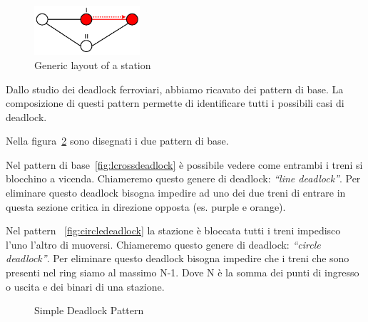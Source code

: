 \documentclass{ewic}
\begin{document}
\begin{figure}[htp]
	\begin{centering}	
	\includegraphics[width=0.35\textwidth, clip]{img/rappresentazione}
	\caption{Generic layout of a station}
	\label{fig:rappresent}
	\end{centering}
\end{figure}

Dallo studio dei deadlock ferroviari, abbiamo ricavato dei pattern di base. 
La composizione di questi pattern permette di identificare tutti i possibili casi di deadlock.

Nella figura~\ref{fig:simpledeadlockpattern} sono disegnati i due pattern di base.

Nel pattern di base~\ref{fig:lcrossdeadlock} è possibile vedere come entrambi i treni si blocchino a vicenda. Chiameremo questo genere di deadlock:  \emph{``line deadlock''}. Per eliminare questo deadlock bisogna impedire ad uno dei due treni di entrare in questa sezione critica in direzione opposta (es. purple e orange).

Nel pattern ~\ref{fig:circledeadlock} la stazione è bloccata tutti i treni impedisco l'uno l'altro di muoversi. Chiameremo questo genere di deadlock:  \emph{``circle deadlock''}. Per eliminare questo deadlock bisogna impedire che i treni che sono presenti nel ring siamo al massimo N-1. Dove N è la somma dei punti di ingresso o uscita e dei binari di una stazione.

\begin{figure}[!htp]
 \centering

 

\caption{Simple Deadlock Pattern}
 \label{fig:simpledeadlockpattern}
 \end{figure}
\end{document}
